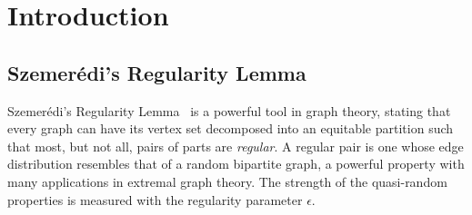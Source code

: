 \section{Introduction} \label{sec:introduction}

    \subsection{Szemer\'edi's Regularity Lemma}

        Szemerédi's Regularity Lemma~\cite{regular_partitions_of_graphs} is a powerful tool in graph theory,
        stating that every graph can have its vertex set decomposed into an equitable partition such that most,
        but not all, pairs of parts are \emph{regular}.
        A regular pair is one whose edge distribution resembles that of a random bipartite graph, a powerful property with
        many applications in extremal graph theory.
        The strength of the quasi-random properties is measured with the regularity parameter $\epsilon$.

